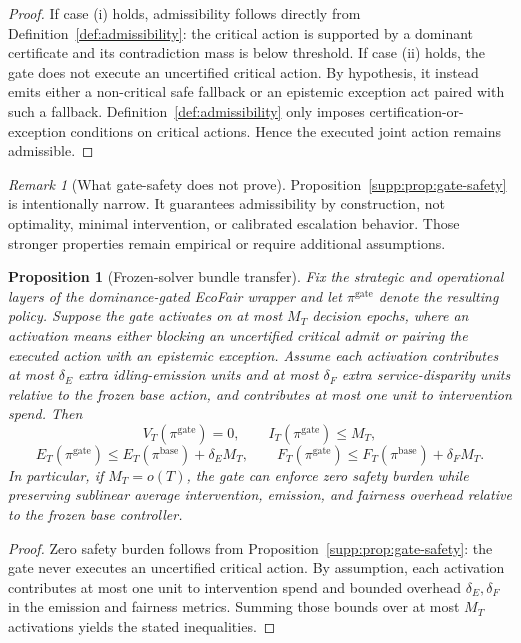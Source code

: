\documentclass[11pt]{article}
\newcommand{\1}{\mathbf{1}}
\theoremstyle{definition}
\theoremstyle{plain}
\newtheorem{proposition}[definition]{Proposition}
\theoremstyle{remark}
\newtheorem{remark}[definition]{Remark}
\begin{document}
\begin{proof}
If case (i) holds, admissibility follows directly from Definition~\ref{def:admissibility}: the critical action is supported by a dominant certificate and its contradiction mass is below threshold. If case (ii) holds, the gate does not execute an uncertified critical action. By hypothesis, it instead emits either a non-critical safe fallback or an epistemic exception act paired with such a fallback. Definition~\ref{def:admissibility} only imposes certification-or-exception conditions on critical actions. Hence the executed joint action remains admissible.\qedhere
\end{proof}

\begin{remark}[What gate-safety does not prove]
\label{supp:rem:gate-safety-limit}
Proposition~\ref{supp:prop:gate-safety} is intentionally narrow. It guarantees admissibility by construction, not optimality, minimal intervention, or calibrated escalation behavior. Those stronger properties remain empirical or require additional assumptions.
\end{remark}

\begin{proposition}[Frozen-solver bundle transfer]
\label{supp:prop:bundle-transfer}
Fix the strategic and operational layers of the dominance-gated EcoFair wrapper and let $\pi^{\mathrm{gate}}$ denote the resulting policy. Suppose the gate activates on at most $M_T$ decision epochs, where an activation means either blocking an uncertified critical admit or pairing the executed action with an epistemic exception. Assume each activation contributes at most $\delta_E$ extra idling-emission units and at most $\delta_F$ extra service-disparity units relative to the frozen base action, and contributes at most one unit to intervention spend. Then
\[
V_T(\pi^{\mathrm{gate}})=0,
\qquad
I_T(\pi^{\mathrm{gate}})\le M_T,
\]
\[
E_T(\pi^{\mathrm{gate}})
\le
E_T(\pi^{\mathrm{base}})+\delta_E M_T,
\qquad
F_T(\pi^{\mathrm{gate}})
\le
F_T(\pi^{\mathrm{base}})+\delta_F M_T.
\]
In particular, if $M_T=o(T)$, the gate can enforce zero safety burden while preserving sublinear average intervention, emission, and fairness overhead relative to the frozen base controller.
\end{proposition}

\begin{proof}
Zero safety burden follows from Proposition~\ref{supp:prop:gate-safety}: the gate never executes an uncertified critical action. By assumption, each activation contributes at most one unit to intervention spend and bounded overhead $\delta_E,\delta_F$ in the emission and fairness metrics. Summing those bounds over at most $M_T$ activations yields the stated inequalities.
\end{proof}
\end{document}

